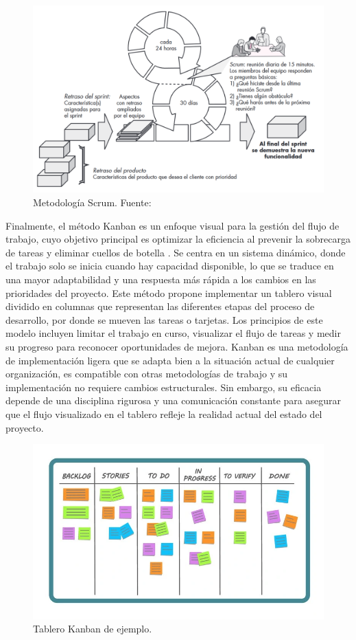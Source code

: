 \begin{figure}[!htb]
    \centering
    \includegraphics[width=\linewidth]{Figures/model-scrum.png}
    \caption{Metodología Scrum. Fuente: \cite{pressman2010ingeneria}}
\end{figure}

Finalmente, el método Kanban es un enfoque visual para la gestión del flujo de trabajo, cuyo objetivo principal es optimizar la eficiencia al prevenir la sobrecarga de tareas y eliminar cuellos de botella \cite{alaidaros2021kanban}. Se centra en un sistema dinámico, donde el trabajo solo se inicia cuando hay capacidad disponible, lo que se traduce en una mayor adaptabilidad y una respuesta más rápida a los cambios en las prioridades del proyecto. Este método propone implementar un tablero visual dividido en columnas que representan las diferentes etapas del proceso de desarrollo, por donde se mueven las tareas o tarjetas. Los principios de este modelo incluyen limitar el trabajo en curso, visualizar el flujo de tareas y medir su progreso para reconocer oportunidades de mejora. Kanban es una metodología de implementación ligera que se adapta bien a la situación actual de cualquier organización, es compatible con otras metodologías de trabajo y su implementación no requiere cambios estructurales. Sin embargo, su eficacia depende de una disciplina rigurosa y una comunicación constante para asegurar que el flujo visualizado en el tablero refleje la realidad actual del estado del proyecto.

\begin{figure}[!htb]
    \centering
    \includegraphics[width=\linewidth]{Figures/model-kanban.png}
    \caption{Tablero Kanban de ejemplo.}
\end{figure}

